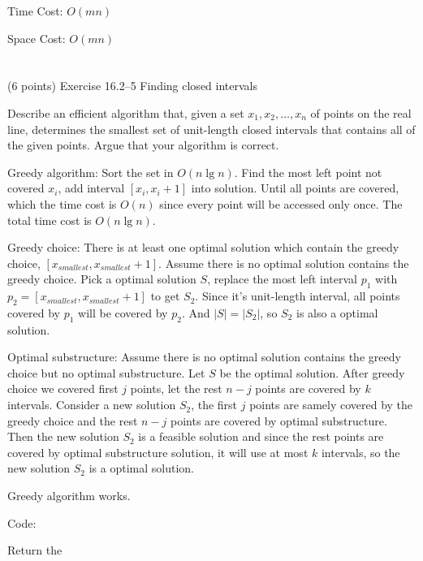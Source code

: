\documentclass[paper=a4, fontsize=11pt]{scrartcl} %
\begin{document}
Time Cost: $O(mn)$

Space Cost: $O(mn)$

\pagebreak

\section{}

\begin{fancyquotes}
  (6 points) Exercise 16.2--5 Finding closed intervals

  Describe an efficient algorithm that, given a set $x_1, x_2, \ldots,
  x_n$ of points on the real line, determines the smallest set of
  unit-length closed intervals that contains all of the given
  points. Argue that your algorithm is correct.
\end{fancyquotes}

Greedy algorithm:
Sort the set in $O(n\lg{n})$. Find the most left point not covered
$x_i$, add interval $[x_i,x_i+1]$ into solution. Until all points are
covered, which the time cost is $O(n)$ since every point will be
accessed only once. The total time cost is $O(n\lg{n})$.

Greedy choice:
There is at least one optimal solution which contain the greedy
choice, $[x_{smallest},x_{smallest}+1]$. Assume there is no optimal
solution contains the greedy choice. Pick a optimal solution $S$,
replace the most left interval $p_1$ with $p_2 =
[x_{smallest},x_{smallest}+1]$ to get $S_2$. Since it's unit-length
interval, all points covered by $p_1$ will be covered by $p_2$. And
$|S|=|S_2|$, so $S_2$ is also a optimal solution.

Optimal substructure:
Assume there is no optimal solution contains the greedy choice but no
optimal substructure. Let $S$ be the optimal solution. After greedy
choice we covered first $j$ points, let the rest $n-j$ points are
covered by $k$ intervals. Consider a new solution $S_2$, the first $j$
points are samely covered by the greedy choice and the rest $n-j$
points are covered by optimal substructure. Then the new solution
$S_2$ is a feasible solution and since the rest points are covered by
optimal substructure solution, it will use at most $k$ intervals, so
the new solution $S_2$ is a optimal solution.

Greedy algorithm works.

Code:
\begin{algorithm}[H]
  \caption{Return the }
\end{algorithm}

\pagebreak
\end{document}
